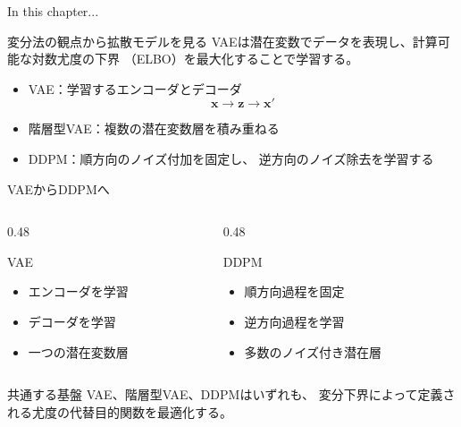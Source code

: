 \begin{frame}{In this chapter...}
    \begin{block}{変分法の観点から拡散モデルを見る}
        VAEは潜在変数でデータを表現し、計算可能な対数尤度の下界
        （ELBO）を最大化することで学習する。
    \end{block}
    \begin{itemize}
        \item VAE：学習するエンコーダとデコーダ
        \[
            \boldsymbol{x}\longrightarrow\boldsymbol{z}
            \longrightarrow\boldsymbol{x}'
        \]
        \item 階層型VAE：複数の潜在変数層を積み重ねる
        \item DDPM：順方向のノイズ付加を固定し、
        逆方向のノイズ除去を学習する
    \end{itemize}
\end{frame}
\begin{frame}{VAEからDDPMへ}
    \begin{columns}[T]
        \begin{column}{0.48\textwidth}
            \begin{block}{VAE}
                \begin{itemize}
                    \item エンコーダを学習
                    \item デコーダを学習
                    \item 一つの潜在変数層
                \end{itemize}
            \end{block}
        \end{column}
        \begin{column}{0.48\textwidth}
            \begin{exampleblock}{DDPM}
                \begin{itemize}
                    \item 順方向過程を固定
                    \item 逆方向過程を学習
                    \item 多数のノイズ付き潜在層
                \end{itemize}
            \end{exampleblock}
        \end{column}
    \end{columns}
    \vspace{0.8em}
    \begin{block}{共通する基盤}
        VAE、階層型VAE、DDPMはいずれも、
        変分下界によって定義される尤度の代替目的関数を最適化する。
    \end{block}
\end{frame}
